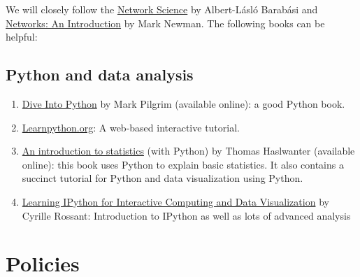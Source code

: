 \documentclass[11pt,article,oneside]{memoir} %
\begin{document}
We will closely follow the
\href{http://barabasi.com/networksciencebook/}{Network Science} by Albert-Lásló
Barabási and
\href{https://www.amazon.com/Networks-Introduction-Mark-Newman/dp/0199206651}{Networks:
An Introduction} by Mark Newman. The following books can be helpful:

\subsection{Python and data analysis} %

\begin{enumerate}

\item \href{http://www.diveintopython3.net/index.html}{Dive Into Python} by Mark Pilgrim (available online): a good Python book. 

\item \href{http://www.learnpython.org}{Learnpython.org}: A web-based interactive tutorial. 

\item \href{http://work.thaslwanter.at/Stats/html/}{An introduction to statistics} (with Python) by Thomas Haslwanter (available online): this book uses Python to explain basic statistics. It also contains a succinct tutorial for Python and data visualization using Python. 

\item \href{http://ipython.rossant.net}{Learning IPython for Interactive Computing and Data Visualization} by  Cyrille Rossant: Introduction to IPython as well as lots of advanced analysis 


\end{enumerate} %
\section{Policies} %
\end{document}
